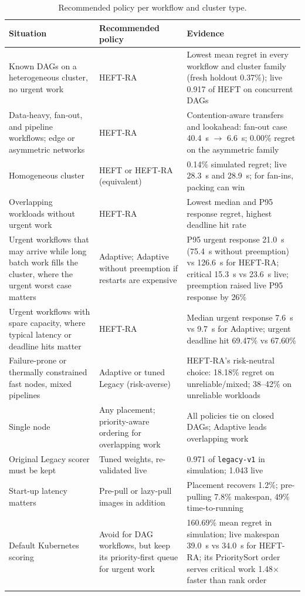 \documentclass[12pt,a4paper]{report}
\begin{document}
\begin{longtable}{L{4.3cm}L{3.4cm}L{6.0cm}}
\toprule
Situation & Recommended policy & Evidence \\
\midrule
\endhead
Known DAGs on a heterogeneous cluster, no urgent work & HEFT-RA & Lowest mean regret in every workflow and cluster family (fresh holdout 0.37\%); live 0.917 of HEFT on concurrent DAGs \\
Data-heavy, fan-out, and pipeline workflows; edge or asymmetric networks & HEFT-RA & Contention-aware transfers and lookahead: fan-out case 40.4~s $\to$ 6.6~s; 0.00\% regret on the asymmetric family \\
Homogeneous cluster & HEFT or HEFT-RA (equivalent) & 0.14\% simulated regret; live 28.3~s and 28.9~s; for fan-ins, packing can win \\
Overlapping workloads without urgent work & HEFT-RA & Lowest median and P95 response regret, highest deadline hit rate \\
Urgent workflows that may arrive while long batch work fills the cluster, where the urgent worst case matters & Adaptive; Adaptive without preemption if restarts are expensive & P95 urgent response 21.0~s (75.4~s without preemption) vs 126.6~s for HEFT-RA; critical 15.3~s vs 23.6~s live; preemption raised live P95 response by 26\% \\
Urgent workflows with spare capacity, where typical latency or deadline hits matter & HEFT-RA & Median urgent response 7.6~s vs 9.7~s for Adaptive; urgent deadline hit 69.47\% vs 67.60\% \\
Failure-prone or thermally constrained fast nodes, mixed pipelines & Adaptive or tuned Legacy (risk-averse) & HEFT-RA's risk-neutral choice: 18.18\% regret on unreliable/mixed; 38--42\% on unreliable workloads \\
Single node & Any placement; priority-aware ordering for overlapping work & All policies tie on closed DAGs; Adaptive leads overlapping work \\
Original Legacy scorer must be kept & Tuned weights, re-validated live & 0.971 of \texttt{legacy-v1} in simulation; 1.043 live \\
Start-up latency matters & Pre-pull or lazy-pull images in addition & Placement recovers 1.2\%; pre-pulling 7.8\% makespan, 49\% time-to-running \\
Default Kubernetes scoring & Avoid for DAG workflows, but keep its priority-first queue for urgent work & 160.69\% mean regret in simulation; live makespan 39.0~s vs 34.0~s for HEFT-RA; its PrioritySort order serves critical work 1.48$\times$ faster than rank order \\
\bottomrule
\caption{Recommended policy per workflow and cluster type.}
\label{tab:recommendations}
\end{longtable}
\end{document}
